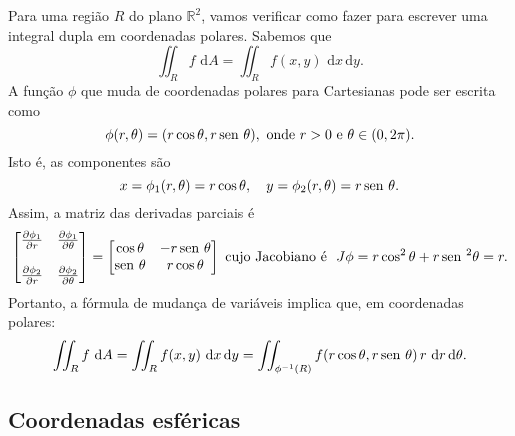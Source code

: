 Para uma região $R$ do plano $\mathbb{R}^2$, vamos verificar como fazer para escrever uma integral dupla em coordenadas polares. Sabemos que
\begin{equation}
\iint_R f \, \, \mathrm{d} A = \iint_R f(x,y) \, \, \mathrm{d} x \, \mathrm{d} y.
\end{equation} A função $\phi$ que muda de coordenadas polares para Cartesianas pode ser escrita como
\begin{equation}
\phi (r, \theta) = (r\cos \theta, r \operatorname{sen}\, \theta), \text{ onde } r> 0 \text{ e } \theta \in (0,2\pi).
\end{equation} Isto é, as componentes são
\begin{equation}
x = \phi_1 (r, \theta) = r\cos \theta, \quad y = \phi_2 (r, \theta) = r \operatorname{sen}\, \theta.
\end{equation} Assim, a matriz das derivadas parciais é
\begin{equation}
\begin{bmatrix}
\frac{\partial \phi_1}{\partial r} & \frac{\partial \phi_1}{\partial \theta} \\
& \\
\frac{\partial \phi_2}{\partial r} & \frac{\partial \phi_2}{\partial \theta} \\
\end{bmatrix} =
\begin{bmatrix}
\cos \theta & -r \operatorname{sen}\, \theta \\
\operatorname{sen}\, \theta & r \cos \theta \\
\end{bmatrix}
 \text{ cujo Jacobiano é } \ J\phi = r \cos^2 \theta + r \operatorname{sen}\,^2 \theta = r.
\end{equation} Portanto, a fórmula de mudança de variáveis implica que, em coordenadas polares:
\begin{equation}
\iint_R f \, \, \mathrm{d} A = \iint_R f(x,y) \, \, \mathrm{d} x \, \mathrm{d} y = \iint_{\phi^{-1}(R)} f(r\cos \theta, r\operatorname{sen}\, \theta) \, r \, \, \mathrm{d} r \, \mathrm{d} \theta.
\end{equation}


\subsection{Coordenadas esféricas}

